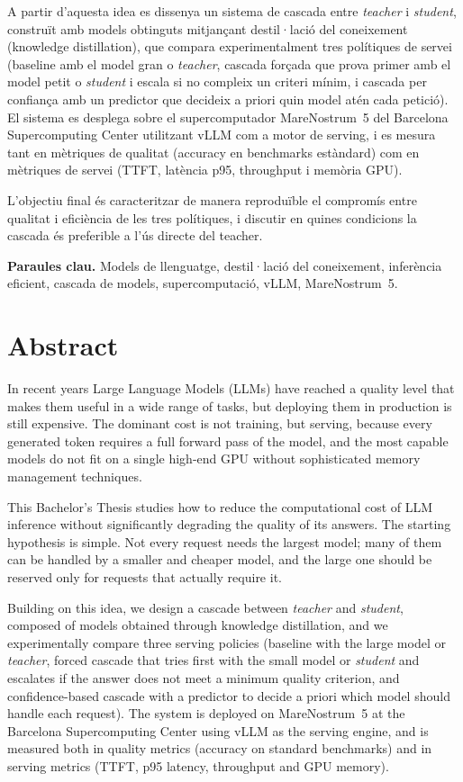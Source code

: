 \documentclass[11pt,a4paper]{article}
\begin{document}
A partir d'aquesta idea es dissenya un sistema de cascada entre \textit{teacher} i \textit{student}, construït amb models obtinguts mitjançant destil·lació del coneixement (knowledge distillation), que compara experimentalment tres polítiques de servei (baseline amb el model gran o \textit{teacher}, cascada forçada que prova primer amb el model petit o \textit{student} i escala si no compleix un criteri mínim, i cascada per confiança amb un predictor que decideix a priori quin model atén cada petició). El sistema es desplega sobre el supercomputador MareNostrum~5 del Barcelona Supercomputing Center utilitzant vLLM com a motor de serving, i es mesura tant en mètriques de qualitat (accuracy en benchmarks estàndard) com en mètriques de servei (TTFT, latència p95, throughput i memòria GPU).

L'objectiu final és caracteritzar de manera reproduïble el compromís entre qualitat i eficiència de les tres polítiques, i discutir en quines condicions la cascada és preferible a l'ús directe del teacher.

\textbf{Paraules clau.} Models de llenguatge, destil·lació del coneixement, inferència eficient, cascada de models, supercomputació, vLLM, MareNostrum~5.

\newpage
\section*{Abstract}

In recent years Large Language Models (LLMs) have reached a quality level that makes them useful in a wide range of tasks, but deploying them in production is still expensive. The dominant cost is not training, but serving, because every generated token requires a full forward pass of the model, and the most capable models do not fit on a single high-end GPU without sophisticated memory management techniques.

This Bachelor's Thesis studies how to reduce the computational cost of LLM inference without significantly degrading the quality of its answers. The starting hypothesis is simple. Not every request needs the largest model; many of them can be handled by a smaller and cheaper model, and the large one should be reserved only for requests that actually require it.

Building on this idea, we design a cascade between \textit{teacher} and \textit{student}, composed of models obtained through knowledge distillation, and we experimentally compare three serving policies (baseline with the large model or \textit{teacher}, forced cascade that tries first with the small model or \textit{student} and escalates if the answer does not meet a minimum quality criterion, and confidence-based cascade with a predictor to decide a priori which model should handle each request). The system is deployed on MareNostrum~5 at the Barcelona Supercomputing Center using vLLM as the serving engine, and is measured both in quality metrics (accuracy on standard benchmarks) and in serving metrics (TTFT, p95 latency, throughput and GPU memory).
\end{document}
